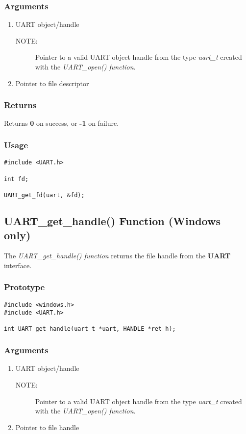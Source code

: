 \documentclass{report}
\begin{document}
\subsubsection*{Arguments}
\begin{enumerate}
\item UART object/handle
\begin{description}
\item[NOTE:] Pointer to a valid UART object handle from the type \textit{uart\_t}
created with the \textit{UART\_open() function}.
\end{description}
\item Pointer to file descriptor
\end{enumerate}
\subsubsection*{Returns}
Returns \textbf{0} on success, or \textbf{-1} on failure.
\subsubsection*{Usage}
\begin{lstlisting}
#include <UART.h>

int fd;

UART_get_fd(uart, &fd);
\end{lstlisting}
\subsection{UART\_get\_handle() Function (Windows only)}
The \textit{UART\_get\_handle() function} returns the file
handle from the \textbf{UART} interface.
\subsubsection*{Prototype}
\begin{lstlisting}
#include <windows.h>
#include <UART.h>

int UART_get_handle(uart_t *uart, HANDLE *ret_h);
\end{lstlisting}
\subsubsection*{Arguments}
\begin{enumerate}
\item UART object/handle
\begin{description}
\item[NOTE:] Pointer to a valid UART object handle from the type \textit{uart\_t}
created with the \textit{UART\_open() function}.
\end{description}
\item Pointer to file handle
\end{enumerate}
\end{document}
